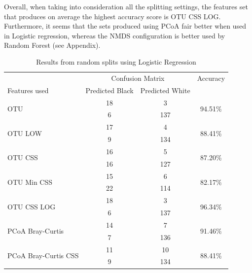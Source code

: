 Overall, when taking into consideration all the splitting settings, the features set that produces on average the highest accuracy score is OTU CSS LOG. Furthermore, it seems that the sets produced using PCoA fair better when used in Logistic regression, whereas the NMDS configuration is better used by Random Forest (see Appendix).
\begin{table}[!h]
	\centering
	\caption{Results from random splits using Logistic Regression}
	\label{table:lrrandom}
	\begin{tabular}{l c  c c}
		\toprule
		&\multicolumn{2}{c}{Confusion Matrix} & Accuracy\\
		Features used & Predicted Black&Predicted White&\\
		\midrule
		\multirow{2}{*}{OTU} &18 &3&\multirow{2}{*}{94.51\%}\\
		&	6&137&\\
		\cmidrule{2-3}
		\multirow{2}{*}{OTU LOW} &17 &4&\multirow{2}{*}{88.41\%}\\
		&	 9&134&\\
		\cmidrule{2-3}
		\multirow{2}{*}{OTU CSS}&16 &5&\multirow{2}{*}{87.20\%}\\
		&	 16&127&\\
		\cmidrule{2-3}
		\multirow{2}{*}{OTU Min CSS}&15 &6&\multirow{2}{*}{82.17\%}\\
		&	 22&114&\\
		\cmidrule{2-3}
		\multirow{2}{*}{OTU CSS LOG}&18 &3&\multirow{2}{*}{96.34\%}\\
		&	6&137&\\
		\cmidrule{2-3}
		\multirow{2}{*}{PCoA Bray-Curtis} &14 &7&\multirow{2}{*}{91.46\%}\\
		&	 7&136&\\
		\cmidrule{2-3}
		\multirow{2}{*}{PCoA Bray-Curtis CSS} &11 &10&\multirow{2}{*}{88.41\%}\\
		&	9&134&\\
		\bottomrule
	\end{tabular}
	
\end{table}

